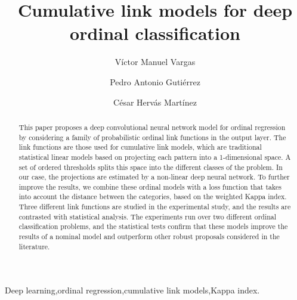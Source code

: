 \documentclass[preprint]{elsarticle}
\begin{document}
\begin{frontmatter}

\title{Cumulative link models for deep ordinal classification}

\author{V\'ictor Manuel Vargas}
\author{Pedro Antonio Guti\'errez}
\author{C\'esar Herv\'as Mart\'inez}
\address{Department of Computer Science and Numerical Analysis, University of C\'ordoba, C\'ordoba, Spain}

\begin{abstract}
	This paper proposes a deep convolutional neural network model for ordinal regression by considering a family of probabilistic ordinal link functions in the output layer. The link functions are those used for cumulative link models, which are traditional statistical linear models based on projecting each pattern into a 1-dimensional space. A set of ordered thresholds splits this space into the different classes of the problem. In our case, the projections are estimated by a non-linear deep neural network. To further improve the results, we combine these ordinal models with a loss function that takes into account the distance between the categories, based on the weighted Kappa index. Three different link functions are studied in the experimental study, and the results are contrasted with statistical analysis. The experiments run over two different ordinal classification problems, and the statistical tests confirm that these models improve the results of a nominal model and outperform other robust proposals considered in the literature.
\end{abstract}

\begin{keyword}
Deep learning\sep ordinal regression\sep cumulative link models\sep Kappa index.
\end{keyword}

\end{frontmatter}

\end{document}
